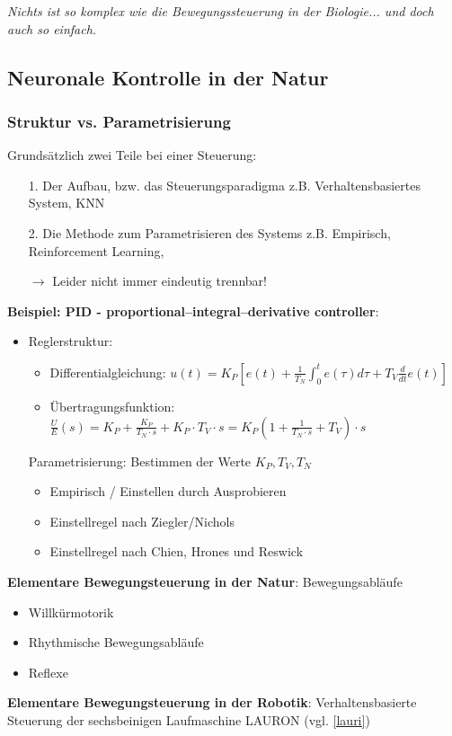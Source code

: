 \emph{Nichts ist so komplex wie die Bewegungssteuerung in der Biologie... und doch auch so einfach.}
\subsection{Neuronale Kontrolle in der Natur}
\subsubsection{Struktur vs. Parametrisierung}
Grundsätzlich zwei Teile bei einer Steuerung:
\begin{itemize}
\item[1.] Der Aufbau, bzw. das Steuerungsparadigma
z.B. Verhaltensbasiertes System, KNN
\item[2.] Die Methode zum Parametrisieren des Systems
z.B. Empirisch, Reinforcement Learning,
\item[$\rightarrow$] Leider nicht immer eindeutig trennbar!
\end{itemize}
\textbf{Beispiel: PID - proportional–integral–derivative controller}:
\begin{itemize}
\item Reglerstruktur:
\begin{itemize}
\item Differentialgleichung: $u(t) = K_P\left[e(t) + \frac{1}{T_N}\int_0^te(\tau)d\tau + T_V\frac{d}{dt}e(t)\right]$
\item Übertragungsfunktion: $\frac{U}{E}(s) = K_P + \frac{K_P}{T_N \cdot s}+K_P\cdot T_V\cdot s = K_P(1 + \frac{1}{T_N \cdot s} + T_V) \cdot s$
\end{itemize}
Parametrisierung: Bestimmen der Werte $K_P, T_V, T_N$
\begin{itemize}
\item Empirisch / Einstellen durch Ausprobieren
\item Einstellregel nach Ziegler/Nichols
\item Einstellregel nach Chien, Hrones und Reswick
\end{itemize}
\end{itemize}
\textbf{Elementare Bewegungsteuerung in der Natur}: Bewegungsabläufe
\begin{itemize}
\item Willkürmotorik
\item Rhythmische Bewegungsabläufe
\item Reflexe
\end{itemize}
\textbf{Elementare Bewegungsteuerung in der Robotik}: Verhaltensbasierte Steuerung der sechsbeinigen Laufmaschine LAURON (vgl. \autoref{lauri})
